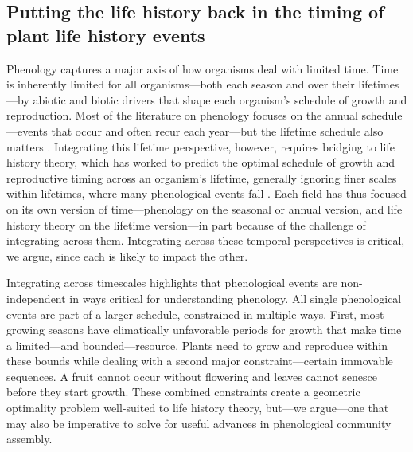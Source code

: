 \documentclass[11pt]{article}
\begin{document}
\subsection*{Putting the life history back in the timing of plant life history events} 

Phenology captures a major axis of how organisms deal with limited time. Time is inherently limited for all organisms---both each season and over their lifetimes---by abiotic and biotic drivers that shape each organism's schedule of growth and reproduction. Most of the literature on phenology focuses on the annual schedule---events that occur and often recur each year---but the lifetime schedule also matters \citep{post2008phenological,park2022seasonal}. Integrating this lifetime perspective, however, requires bridging to life history theory, which has worked to predict the optimal schedule of growth and reproductive timing across an organism's lifetime, generally ignoring finer scales within lifetimes, where many phenological events fall \citep[but see][]{bazzaz1987allocating,ejsmond2010time}. Each field has thus focused on its own version of time---phenology on the seasonal or annual version, and life history theory on the lifetime version---in part because of the challenge of integrating across them. Integrating across these temporal perspectives is critical, we argue, since each is likely to impact the other. 

Integrating across timescales highlights that phenological events are non-independent in ways critical for understanding phenology. All single phenological events are part of a larger schedule, constrained in multiple ways. First, most growing seasons have climatically unfavorable periods for growth that make time a limited---and bounded---resource. Plants need to grow and reproduce within these bounds while dealing with a second major constraint---certain immovable sequences. A fruit cannot occur without flowering and leaves cannot senesce before they start growth. These combined constraints create a geometric optimality problem well-suited to life history theory, but---we argue---one that may also be imperative to solve for useful advances in phenological community assembly.
\end{document}
